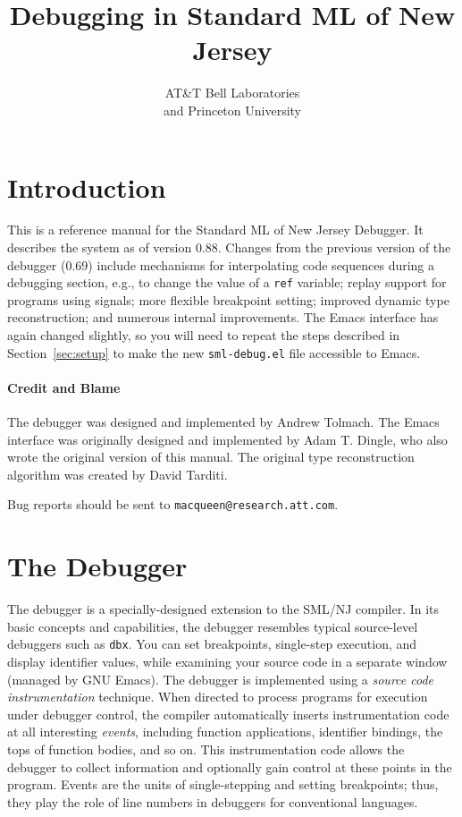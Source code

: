 \setlength{\textheight}{8.8in}
\setlength{\textwidth}{6.5in}
\setlength{\oddsidemargin}{0in}
\setlength{\topmargin}{-.1in}
\setlength{\headheight}{0in}
\setlength{\headsep}{0in}

\title{Debugging in Standard ML of New Jersey}
\author{AT\&T Bell Laboratories\\
and Princeton University}

\maketitle
\section{Introduction}
\label{sec:intro}
This is a reference
manual for the Standard ML of New Jersey Debugger.
It describes the system as of version 0.88. Changes from
the previous version of the debugger (0.69) include mechanisms for 
interpolating code sequences during a debugging section, e.g., to change
the value of a {\tt ref} variable; replay support for programs using signals;
more flexible breakpoint setting; improved dynamic type reconstruction;
and numerous internal improvements.
The Emacs interface has again changed
slightly, so you will need to repeat the steps described in 
Section~\ref{sec:setup} to make the new {\tt sml-debug.el} file accessible to Emacs.

\paragraph{Credit and Blame}
The debugger was designed and implemented by Andrew Tolmach.
The Emacs interface was originally designed and implemented
by Adam T. Dingle, who also wrote
the original version of this manual.  The original 
type reconstruction algorithm was created by David Tarditi.

Bug reports should be sent to {\tt macqueen@research.att.com}.

\section{The Debugger}
\label{sec:general}
The debugger is a specially-designed extension to the SML/NJ compiler.
In its basic concepts and capabilities, the debugger resembles typical 
source-level debuggers such as {\tt dbx}.  
You can set breakpoints, single-step 
execution, and display identifier values, while examining your source code 
in a separate window (managed by GNU Emacs).  The debugger is implemented
using a {\em source code instrumentation} technique.  When directed to 
process programs
for execution under debugger control, the compiler automatically inserts
instrumentation code at all interesting {\em events}, including function
applications, identifier bindings, the tops of function bodies, and so on.
This instrumentation code allows the debugger to collect information and 
optionally gain control at these points in the program.  Events are the
units of single-stepping and setting breakpoints; thus, they
play the role of line numbers in debuggers for conventional languages.

